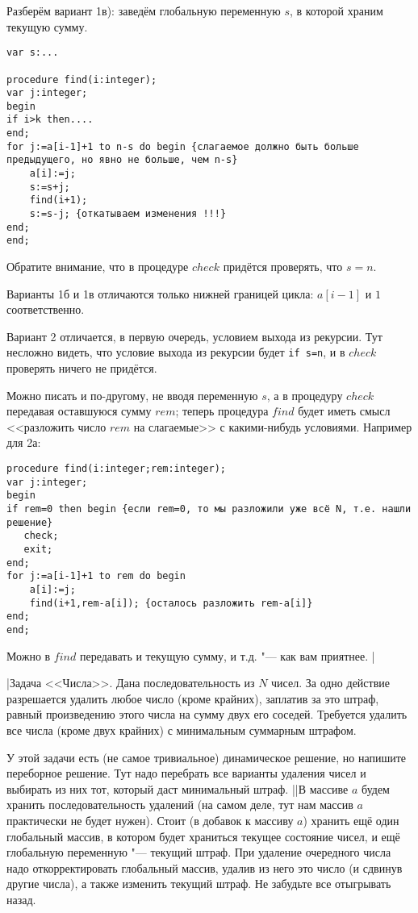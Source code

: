 Разберём вариант 1в): заведём глобальную переменную $s$, в которой храним текущую сумму. 

\begin{codesampleo}\begin{verbatim}
var s:...

procedure find(i:integer);
var j:integer;
begin
if i>k then....
end;
for j:=a[i-1]+1 to n-s do begin {слагаемое должно быть больше предыдущего, но явно не больше, чем n-s}
    a[i]:=j;
    s:=s+j;
    find(i+1);
    s:=s-j; {откатываем изменения !!!}
end;
end;
\end{verbatim}
\end{codesampleo}

Обратите внимание, что в процедуре $check$ придётся проверять, что $s=n$.

Варианты 1б и 1в отличаются только нижней границей цикла: $a[i-1]$ и $1$ соответственно.

Вариант 2 отличается, в первую очередь, условием выхода из рекурсии. Тут несложно видеть, что 
условие выхода из рекурсии будет \texttt{if s=n}, и в $check$ проверять ничего не придётся.

Можно писать и по-другому, не вводя переменную $s$, а в процедуру $check$ передавая оставшуюся сумму $rem$; теперь процедура $find$ будет иметь смысл <<разложить число $rem$ на слагаемые>> с какими-нибудь условиями. Например для 2а:
\begin{codesampleo}\begin{verbatim}
procedure find(i:integer;rem:integer); 
var j:integer;
begin
if rem=0 then begin {если rem=0, то мы разложили уже всё N, т.е. нашли решение}
   check;
   exit;
end;
for j:=a[i-1]+1 to rem do begin
    a[i]:=j;
    find(i+1,rem-a[i]); {осталось разложить rem-a[i]}
end;
end;
\end{verbatim}
\end{codesampleo}
Можно в $find$ передавать и текущую сумму, и т.д. "--- как вам приятнее.
|

\task|Задача <<Числа>>. Дана последовательность из $N$ чисел. За одно действие разрешается удалить любое число (кроме крайних), заплатив за это штраф, равный произведению этого числа на сумму двух его соседей. Требуется удалить все числа (кроме двух крайних) с минимальным суммарным штрафом. 

У этой задачи есть (не самое тривиальное) динамическое решение, но напишите переборное решение. Тут надо перебрать все варианты удаления чисел и выбирать из них тот, который даст минимальный штраф.
||В массиве $a$ будем хранить последовательность удалений (на самом деле, тут нам массив $a$ практически не будет нужен). Стоит (в добавок к массиву $a$) хранить ещё один
глобальный массив, в котором будет храниться текущее состояние чисел, и ещё глобальную 
переменную "--- текущий штраф. При удаление очередного числа надо откорректировать глобальный массив, удалив из него это число (и сдвинув другие числа), а также изменить текущий штраф. Не забудьте все отыгрывать назад. 

